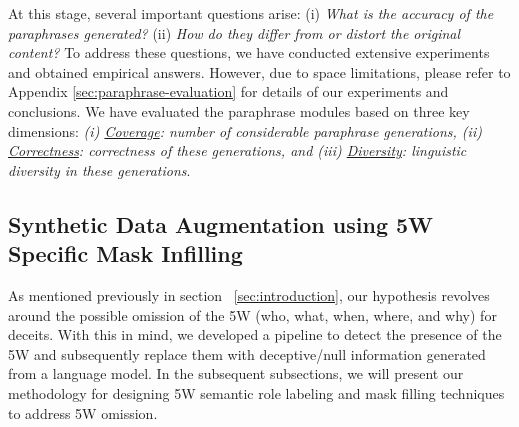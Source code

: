 At this stage, several important questions arise: (i) \emph{What is the accuracy of the paraphrases generated?} (ii) \emph{How do they differ from or distort the original content?} To address these questions, we have conducted extensive experiments and obtained empirical answers. However, due to space limitations, please refer to Appendix \ref{sec:paraphrase-evaluation} for details of our experiments and conclusions. We have evaluated the paraphrase modules based on three key dimensions: \textit{(i) \ul{Coverage}: number of considerable paraphrase generations, (ii) \ul{Correctness}: correctness of these generations, and (iii) \ul{Diversity}: linguistic diversity in these generations}.



\subsection{Synthetic Data Augmentation using 5W Specific Mask Infilling}
\vspace{-1mm}
As mentioned previously in section ~\ref{sec:introduction}, our hypothesis revolves around the possible omission of the 5W (who, what, when, where, and why) for deceits. With this in mind, we developed a pipeline to detect the presence of the 5W and subsequently replace them with deceptive/null information generated from a language model. In the subsequent subsections, we will present our methodology for designing 5W semantic role labeling and mask filling techniques to address 5W omission.

\begin{comment}
\begin{tcolorbox}[colback=blue!5!white,colframe=blue!75!black,title=Data augmentation pipeline]
We achieved this task in the following steps:

\begin{enumerate}
    \item STEP 1: Paraphrase the tweets and the claims, generating 5 paraphrases for each using GPT3 Text Da Vinci Model

    \item STEP 2: Pass the paraphrased texts through the AllenNLP model to generate the 5Ws for each

    \item STEP 3: MASK the Ws and generate top 3 words for each masked W.

    \item STEP 4: Replace the Ws with the words and generate new sentences with each prompt.

    \item STEP 5: List all the newly generated sentences in a single file.
    
\end{enumerate}
\end{tcolorbox}
\end{comment}


